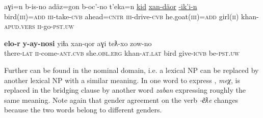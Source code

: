 \documentclass[output=paper]{LSP/langsci}
\begin{document}
\begin{exe}
	\ex	\label{ex:15ab}
	\begin{xlist}
		\ex	\label{ex:15a}
		\gll	aɣi=n   		b-is-no    		adäz=gon  	b-oc’-no    		t’eka=n \underline{kid}  	\underline{xan-däor}   		\underline{-ik’i-n}\\
			bird(\textsc{iii})=\textsc{add} 	\textsc{iii}-take-\textsc{cvb}  	ahead=\textsc{cntr} 	\textsc{iii}-drive-\textsc{cvb}  	he.goat(\textsc{iii})=\textsc{add} girl(\textsc{ii}) 	khan-\textsc{apud.vers} 	\textsc{ii}-go-\textsc{pst.uw} \\
		\glt	{}

		\ex	\label{ex:15b}
		\gll			\textbf{elo-r}    	\textbf{y-ay-nosi}   			yiɬa    			xan-qor      		aɣi teƛ-xo    			zow-no \\
			there-\textsc{lat}	\textsc{ii}-come-\textsc{ant.cvb} 	she.\textsc{obl.erg}  	khan-\textsc{at.lat} 	bird give-\textsc{icvb}  		be\textsc{-pst.uw}   \\
		\glt	{}
	\end{xlist}
\end{exe}

Further  can be found in the nominal domain, i.e. a lexical NP can be replaced by another lexical NP with a similar meaning. In  one word to express , \textit{meχ}, is replaced in the bridging clause by another word \textit{zaban} expressing roughly the same meaning. Note again that gender agreement on the verb \textit{-e͂ƛe}  changes because the two words belong to different genders. 
\end{document}
